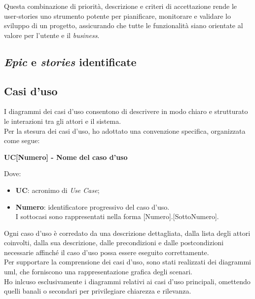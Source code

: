 \noindent Questa combinazione di priorità, descrizione e criteri di accettazione rende le \gls{user-stories} uno strumento potente per pianificare, monitorare e validare lo sviluppo di un progetto, assicurando che tutte le funzionalità siano orientate al valore per l’utente e il \textit{business}.

\pagebreak
\subsection*{\textit{Epic} e \textit{stories} identificate}
\label{subsubsec:epic-stories}



\subsection{Casi d'uso}
\label{subsec:casi-duso}

I diagrammi dei casi d’uso consentono di descrivere in modo chiaro e strutturato le interazioni tra gli attori e il sistema.\\

\noindent Per la stesura dei casi d’uso, ho adottato una convenzione specifica, organizzata come segue:

\begin{center}
\textbf{UC[Numero] - Nome del caso d’uso}
\end{center}

Dove:
\begin{itemize}
    \item \textbf{UC}: acronimo di \textit{Use Case};
    \item \textbf{Numero}: identificatore progressivo del caso d’uso.\\
    I sottocasi sono rappresentati nella forma [Numero].[SottoNumero].
\end{itemize}

\noindent Ogni caso d’uso è corredato da una descrizione dettagliata, dalla lista degli attori coinvolti, dalla sua descrizione, dalle precondizioni e dalle postcondizioni necessarie affinché il caso d’uso possa essere eseguito correttamente.\\

\noindent Per supportare la comprensione dei casi d’uso, sono stati realizzati dei diagrammi \gls{uml}, che forniscono una rappresentazione grafica degli scenari. \\
Ho inlcuso esclusivamente i diagrammi relativi ai casi d’uso principali, omettendo quelli banali o secondari per privilegiare chiarezza e rilevanza.\\

